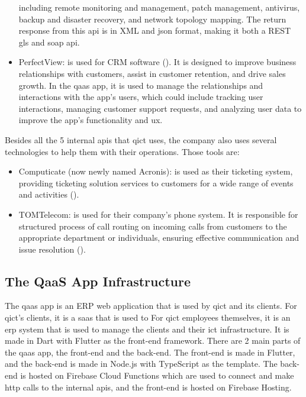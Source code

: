 \begin{multicols}{2}
\begin{itemize}
                  including remote monitoring and management, patch management, antivirus, backup and disaster
                  recovery, and network topology mapping. The return response from this \acrshort{api} is in \gls{XML}
                  and \acrshort{json} format, making it both a \gls{REST gls} and \acrshort{soap} \acrshort{api}.
            \item PerfectView: is used for \gls{CRM} software (\textit{\cite{perfectView}}). It is designed to
                  improve business relationships with customers, assist in customer retention, and drive sales growth.
                  In the \acrshort{qaas} app, it is used to manage the relationships and interactions with the app's users,
                  which could include tracking user interactions, managing customer support requests, and analyzing user
                  data to improve the app's functionality and \acrshort{ux}.
      \end{itemize}

      Besides all the 5 internal \acrshort{api}s that \acrshort{qict} uses, the company also uses several technologies to help them with their
      operations. Those tools are:

      \begin{itemize}
            \item Computicate (now newly named Acronis): is used as their ticketing system, providing ticketing solution services to customers for
                  a wide range of events and activities (\textit{\cite{computicate}}).
            \item TOMTelecom: is used for their company's phone system. It is responsible for structured process of call routing on incoming calls
                  from customers to the appropriate department or individuals, ensuring effective communication and issue resolution
                  (\textit{\cite{tomTelecom}}).
      \end{itemize}

      \subsection{The QaaS App Infrastructure}

      The \acrshort{qaas} app is an \gls{ERP} web application that is used by \acrshort{qict} and its clients.
      For \acrshort{qict}'s clients, it is a \acrshort{saas} that is used to
      For \acrshort{qict} employees themselves, it is an \acrshort{erp} system that is used to manage the clients and their
      \acrshort{ict} infrastructure. It is made in Dart with Flutter as the front-end framework. There are 2 main parts of the
      \acrshort{qaas} app, the front-end and the back-end. The front-end is made in Flutter, and the back-end is made in Node.js with
      TypeScript as the template. The back-end is hosted on Firebase Cloud Functions which are used to connect and make \acrshort{http}
      calls to the internal \acrshort{api}s, and the front-end is hosted on Firebase Hosting.
\end{multicols}


